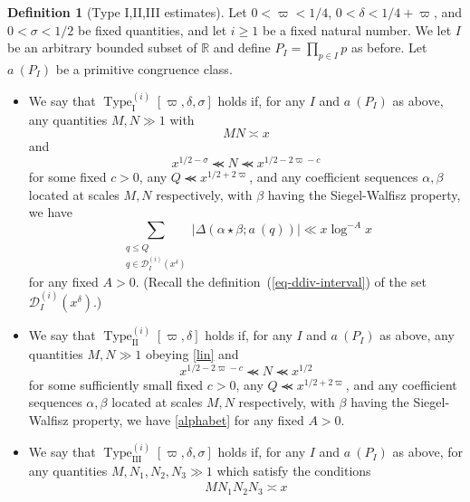 \documentclass[12pt,a4paper,reqno]{amsart}
\numberwithin{equation}{section}
\theoremstyle{plain}
\theoremstyle{definition}
\newtheorem{definition}[theorem]{Definition}
\newcommand\R{\mathbb{R}}
\newcommand\Scal{\mathcal{S}}
\newcommand{\DI}[3]{\mathcal{D}_{{#1}}^{({#2})}({#3})}
\newcommand\TypeI{\operatorname{Type}_{\operatorname{I}}}
\newcommand\TypeII{\operatorname{Type}_{\operatorname{II}}}
\newcommand\TypeIII{\operatorname{Type}_{\operatorname{III}}}
\renewcommand{\sim}{\asymp}
\renewcommand{\lessapprox}{\llcurly}
\begin{document}
\begin{definition}[Type I,II,III estimates]\label{type-def}  Let $0 <
  \varpi < 1/4$, $0 < \delta < 1/4+\varpi$, and $0 < \sigma < 1/2$ be
  fixed quantities, and let $i \geq 1$ be a fixed natural number.  We
  let $I$ be an arbitrary bounded subset of $\R$ and define $P_I =
  \prod_{p \in I} p$ as before. Let $a\ (P_I)$ be a primitive
  congruence class.%
\begin{itemize}
\item[(i)]  We say that $\TypeI^{(i)}[\varpi,\delta,\sigma]$ holds if, for any $I$ and $a\ (P_I)$ as above, any quantities $M,N \gg 1$ with
\begin{equation}\label{lin} M N \sim x 
\end{equation}
and
\begin{equation}\label{xss}
 x^{1/2-\sigma} \lessapprox N \lessapprox x^{1/2-2\varpi-c}
\end{equation}
for some fixed $c>0$, any $Q \lessapprox x^{1/2+2\varpi}$, and any
coefficient sequences $\alpha,\beta$ located at scales $M,N$
respectively, with $\beta$ having the Siegel-Walfisz property, we have
\begin{equation}\label{alphabet}
 \sum_{\substack{q\leq Q\\q \in \DI{I}{i}{x^\delta}}} |\Delta(\alpha \star \beta; a\ (q))|
\ll x \log^{-A} x
\end{equation}
for any fixed $A>0$.  (Recall the definition~(\ref{eq-ddiv-interval})
of the set $\DI{I}{i}{x^{\delta}}$.)
\item[(ii)]  We say that $\TypeII^{(i)}[\varpi,\delta]$ holds if, for any $I$ and $a\ (P_I)$ as above, any quantities $M,N \gg 1$ obeying \eqref{lin} and
\begin{equation}\label{xss-2}
 x^{1/2-2\varpi-c} \lessapprox N \lessapprox x^{1/2}
\end{equation}
for some sufficiently small fixed $c>0$, any $Q \lessapprox
x^{1/2+2\varpi}$, and any coefficient sequences $\alpha,\beta$ located
at scales $M,N$ respectively, with $\beta$ having the Siegel-Walfisz
property, we have \eqref{alphabet} for any fixed $A>0$.
\item[(iii)] We say that $\TypeIII^{(i)}[\varpi,\delta,\sigma]$ holds if, for
  any $I$ and $a\ (P_I)$ as above, for any quantities $M, N_1,N_2,N_3 \gg
  1$ which satisfy the conditions
\begin{gather}
 M N_1 N_2 N_3 \sim x
\nonumber\\

\end{gather}
\end{itemize}
\end{definition}
\end{document}
